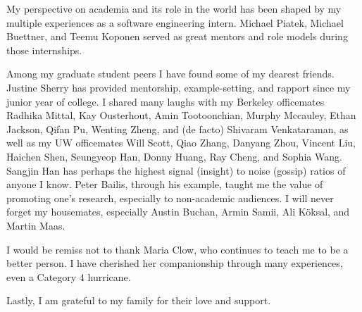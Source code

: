\begin{acknowledgements}
My perspective on academia and its role in the world has been shaped by my
multiple experiences as a software engineering intern. Michael Piatek,
Michael Buettner, and Teemu Koponen served as great mentors and role models
during those internships.

Among my graduate student peers I have found some of my dearest friends.
Justine Sherry has provided mentorship, example-setting, and rapport
since my junior year of college. I shared many laughs with my Berkeley officemates
Radhika Mittal, Kay Ousterhout, Amin Tootoonchian, Murphy Mccauley, Ethan
Jackson, Qifan Pu, Wenting Zheng, and (de
facto) Shivaram Venkataraman, as well as my UW officemates Will Scott, Qiao
Zhang, Danyang Zhou, Vincent Liu, Haichen Shen, Seungyeop Han, Donny Huang, Ray Cheng, and Sophia Wang.
Sangjin Han has perhaps the highest signal (insight) to noise (gossip)
ratios of anyone I know. Peter Bailis, through his example, taught me the
value of promoting one's research, especially to non-academic audiences.
I will never forget my housemates, especially Austin Buchan, Armin
Samii, Ali K\"oksal, and Martin Maas.

I would be remiss not to thank Maria Clow, who continues to teach
me to be a better person. I have cherished her companionship through
many experiences, even a Category 4 hurricane.

Lastly, I am grateful to my family for their love and support.

%
%



\end{acknowledgements}
